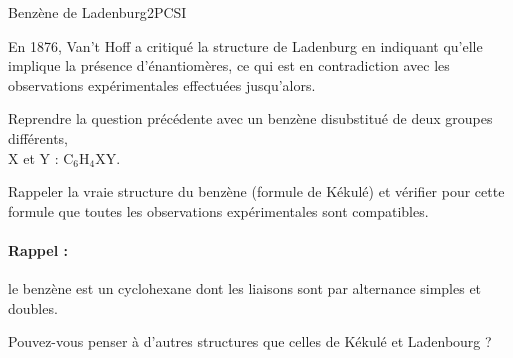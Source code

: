 \begin{exercise}{Benzène de Ladenburg}{2}{PCSI}
\begin{questions}
\question En 1876, Van't Hoff a critiqué la structure de Ladenburg en indiquant qu'elle implique la présence d'énantiomères, ce qui est en contradiction avec les observations expérimentales effectuées jusqu'alors.

\question Reprendre la question précédente avec un benzène disubstitué de deux groupes différents, \\
X et Y : $\mathrm{C_6H_4XY}$.

\question Rappeler la vraie structure du benzène (formule de Kékulé) et vérifier pour cette formule que toutes les observations expérimentales sont compatibles.
\paragraph{Rappel :} le benzène est un cyclohexane dont les liaisons sont par alternance simples et doubles.

\end{questions}

\plusloin Pouvez-vous penser à d'autres structures que celles de Kékulé et Ladenbourg ?

\end{exercise}